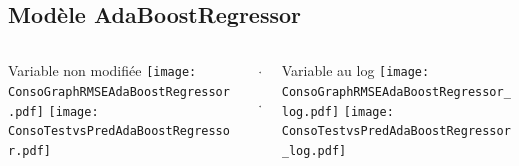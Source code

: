 \documentclass[8pt,aspectratio=169,hyperref={unicode=true}]{beamer}
\begin{document}
\subsection{Modèle AdaBoostRegressor}
\begin{frame}{\insertsubsection}
  \begin{columns}[t]
    \begin{column}{.33\textwidth}
      \centering Variable non modifiée
      \texttt{[image: ConsoGraphRMSEAdaBoostRegressor.pdf]}
      \texttt{[image: ConsoTestvsPredAdaBoostRegressor.pdf]}
    \end{column}
    \begin{column}{.33\textwidth}
      $\Longleftarrow$
      \scriptsize
      {\centering
        }
      

      \normalsize
      $\Longleftarrow$

      \raggedleft{$\Longrightarrow$}
      \scriptsize
      {\centering
        }
      

      \normalsize
      \raggedleft{$\Longrightarrow$}
    \end{column}
    \begin{column}{.33\textwidth}
      \centering Variable au log
      \texttt{[image: ConsoGraphRMSEAdaBoostRegressor\_log.pdf]}
      \texttt{[image: ConsoTestvsPredAdaBoostRegressor\_log.pdf]}
    \end{column}
  \end{columns}
\end{frame}
\end{document}

